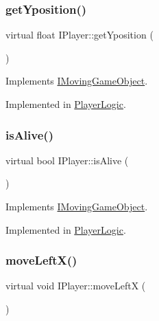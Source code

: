 \subsubsection{\texorpdfstring{get\+Yposition()}{getYposition()}}
{\footnotesize\ttfamily virtual float I\+Player\+::get\+Yposition (\begin{DoxyParamCaption}{ }\end{DoxyParamCaption})\hspace{0.3cm}{\ttfamily [pure virtual]}}



Implements \hyperlink{class_i_moving_game_object_a153c0017219e17262a9cceddba3f61d6}{I\+Moving\+Game\+Object}.



Implemented in \hyperlink{class_player_logic_a58d683bde5ee078f3b21897f2a5f4677}{Player\+Logic}.

\mbox{\label{class_i_player_a5b417cd92b4463e1c296a627430282b6}} 
\subsubsection{\texorpdfstring{is\+Alive()}{isAlive()}}
{\footnotesize\ttfamily virtual bool I\+Player\+::is\+Alive (\begin{DoxyParamCaption}{ }\end{DoxyParamCaption})\hspace{0.3cm}{\ttfamily [pure virtual]}}



Implements \hyperlink{class_i_moving_game_object_ab88f75c872699dd1376e5e83f6188e34}{I\+Moving\+Game\+Object}.



Implemented in \hyperlink{class_player_logic_a765133271ba47a6fa9b2b45136f1fe73}{Player\+Logic}.

\mbox{\label{class_i_player_a46d098eef1da625e555852341ced76c9}} 
\subsubsection{\texorpdfstring{move\+Left\+X()}{moveLeftX()}}
{\footnotesize\ttfamily virtual void I\+Player\+::move\+LeftX (\begin{DoxyParamCaption}{ }\end{DoxyParamCaption})\hspace{0.3cm}{\ttfamily [pure virtual]}}



